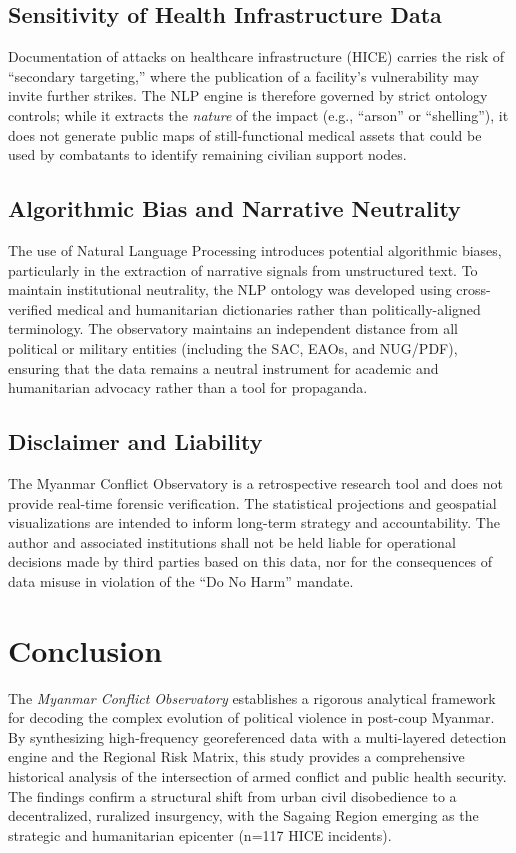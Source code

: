 \documentclass[conference]{IEEEtran}
\begin{document}
\subsection{Sensitivity of Health Infrastructure Data}
Documentation of attacks on healthcare infrastructure (HICE) carries the risk of ``secondary targeting,'' where the publication of a facility's vulnerability may invite further strikes. The NLP engine is therefore governed by strict ontology controls; while it extracts the \textit{nature} of the impact (e.g., ``arson'' or ``shelling''), it does not generate public maps of still-functional medical assets that could be used by combatants to identify remaining civilian support nodes.

\subsection{Algorithmic Bias and Narrative Neutrality}
The use of Natural Language Processing introduces potential algorithmic biases, particularly in the extraction of narrative signals from unstructured text. To maintain institutional neutrality, the NLP ontology was developed using cross-verified medical and humanitarian dictionaries rather than politically-aligned terminology. The observatory maintains an independent distance from all political or military entities (including the SAC, EAOs, and NUG/PDF), ensuring that the data remains a neutral instrument for academic and humanitarian advocacy rather than a tool for propaganda.

\subsection{Disclaimer and Liability}
The Myanmar Conflict Observatory is a retrospective research tool and does not provide real-time forensic verification. The statistical projections and geospatial visualizations are intended to inform long-term strategy and accountability. The author and associated institutions shall not be held liable for operational decisions made by third parties based on this data, nor for the consequences of data misuse in violation of the ``Do No Harm'' mandate.

\section{Conclusion}

The \textit{Myanmar Conflict Observatory} establishes a rigorous analytical framework for decoding the complex evolution of political violence in post-coup Myanmar. By synthesizing high-frequency georeferenced data with a multi-layered detection engine and the Regional Risk Matrix, this study provides a comprehensive historical analysis of the intersection of armed conflict and public health security. The findings confirm a structural shift from urban civil disobedience to a decentralized, ruralized insurgency, with the Sagaing Region emerging as the strategic and humanitarian epicenter (n=117 HICE incidents).
\end{document}
